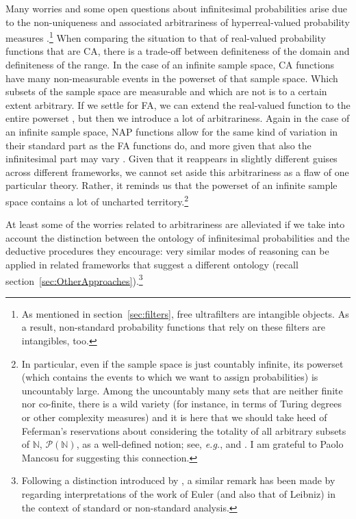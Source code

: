 Many worries and some open questions about infinitesimal probabilities arise due to the non-uniqueness and associated arbitrariness of hyperreal-valued probability measures \citep[also discussed, \textit{e.g.}, by][]{Hofweber:2014}.\footnote{As mentioned in section~\ref{sec:filters}, free ultrafilters are intangible objects. As a result, non-standard probability functions that rely on these filters are intangibles, too.} When comparing the situation to that of real-valued probability functions that are CA, there is a trade-off between definiteness of the domain and definiteness of the range. In the case of an infinite sample space, CA functions have many non-measurable events in the powerset of that sample space. Which subsets of the sample space are measurable and which are not is to a certain extent arbitrary. If we settle for FA, we can extend the real-valued function to the entire powerset \citep[by considering Banach limits; see for instance][]{SchurzLeitgeb:2008}, but then we introduce a lot of arbitrariness. Again in the case of an infinite sample space, NAP functions allow for the same kind of variation in their standard part as the FA functions do, and more given that also the infinitesimal part may vary \citep[see for instance][]{Kremer:2014}. Given that it reappears in slightly different guises across different frameworks, we cannot set aside this arbitrariness as a flaw of one particular theory. Rather, it reminds us that the powerset of an infinite sample space contains a lot of uncharted territory.\footnote{In particular, even if the sample space is just countably infinite, its powerset (which contains the events to which we want to assign probabilities) is uncountably large. Among the uncountably many sets that are neither finite nor co-finite, there is a wild variety (for instance, in terms of Turing degrees or other complexity measures) and it is here that we should take heed of Feferman's reservations about considering the totality of all arbitrary subsets of $\mathbb{N}$, $\mathcal{P}(\mathbb{N})$, as a well-defined notion; see, \textit{e.g.}, \citet[p.~166]{Feferman:1979} and \citet{Feferman:1999}. I am grateful to Paolo Mancosu for suggesting this connection.}

At least some of the worries related to arbitrariness are alleviated if we take into account the distinction between the ontology of infinitesimal probabilities and the deductive procedures they encourage: very similar modes of reasoning can be applied in related frameworks that suggest a different ontology (recall section~\ref{sec:OtherApproaches}).\footnote{Following a distinction introduced by \citet{Benacerraf:1965}, a similar remark has been made by \citet[section~2.3]{Katz:201x} regarding interpretations of the work of Euler (and also that of Leibniz) in the context of standard or non-standard analysis.}

